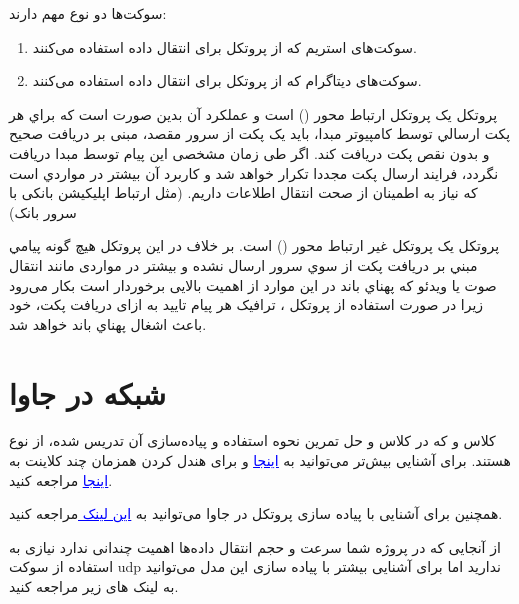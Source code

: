\documentclass[]{article}
\begin{document}
سوکت‌ها دو نوع مهم دارند:

\begin{enumerate}

\item
سوکت‌های استریم که از پروتکل \href{TCP}{\textcolor{blue}{\underline{}}} برای انتقال داده استفاده می‌کنند.

\item
سوکت‌های دیتاگرام که از پروتکل \href{https://en.wikipedia.org/wiki/User_Datagram_Protocol}{\textcolor{blue}{\underline{}}} برای انتقال داده استفاده می‌کنند.

\end{enumerate}

پروتکل  يک پروتکل ارتباط محور () است و عملکرد آن بدين صورت است که براي هر پکت ارسالي توسط کامپيوتر مبدا، بايد يک پکت از سرور مقصد، مبنی بر دريافت صحيح و بدون نقص پکت دريافت کند. اگر طی زمان مشخصی اين پيام توسط مبدا دريافت نگردد، فرايند ارسال پکت مجددا تکرار خواهد شد و کاربرد آن بيشتر در مواردي است که نياز به اطمينان از صحت انتقال اطلاعات داريم. (مثل ارتباط اپلیکیشن بانکی با سرور بانک)


پروتکل  يک پروتکل غیر ارتباط محور () است. بر خلاف  در اين پروتکل هيچ گونه پيامي مبني بر دريافت پکت از سوي سرور ارسال نشده و بيشتر در مواردی مانند انتقال صوت يا ويدئو که پهناي باند در اين موارد از اهمیت بالایی برخوردار است بكار می‌رود زيرا در صورت استفاده از پروتکل ، ترافيک هر پيام تایید به ازای دریافت پکت، خود باعث اشغال پهناي باند خواهد شد.

\section*{{\titr شبکه در جاوا}}

کلاس  و  که در کلاس و حل تمرین نحوه استفاده و پیاده‌سازی آن تدریس شده، از نوع  هستند. برای آشنایی بیش‌تر می‌توانید به
 \href{اینجا}{\textcolor{blue}{\underline{{اینجا}}}} و
  برای هندل کردن همزمان چند کلاینت به
   \href{https://medium.com/martinomburajr/java-create-your-own-hello-world-server-2ca33b6957e}{\textcolor{blue}{\underline{{اینجا}}}}
    مراجعه کنید.
    
همچنین برای آشنایی با پیاده سازی پروتکل  در جاوا می‌توانید به
 \href{این لینک }{\textcolor{blue}{\underline{{این لینک }}}}
 مراجعه کنید.


از آنجایی که در پروژه شما سرعت و حجم انتقال داده‌ها اهمیت چندانی ندارد نیازی به استفاده از سوکت udp ندارید اما برای آشنایی بیشتر با پیاده سازی این مدل می‌توانید به لینک های زیر مراجعه کنید.
\end{document}
